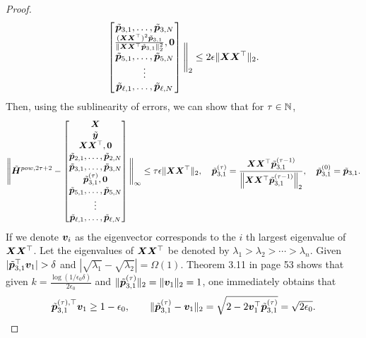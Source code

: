 \begin{proof}
\begin{align*}
\begin{bmatrix}
            \tilde{\boldsymbol{p}}_{3,1},\ldots,\tilde{\boldsymbol{p}}_{3,N}\\
            \frac{(\boldsymbol{X}\boldsymbol{X}^\top)^2\tilde{\boldsymbol{p}}_{3,1}}{\Vert\boldsymbol{X}\boldsymbol{X}^\top\tilde{\boldsymbol{p}}_{3,1}\Vert_2^2},\boldsymbol{0}\\
            \tilde{\boldsymbol{p}}_{5,1},\ldots,\tilde{\boldsymbol{p}}_{5,N}\\
            \vdots\\
            \tilde{\boldsymbol{p}}_{\ell,1},\ldots,\tilde{\boldsymbol{p}}_{\ell,N}
        \end{bmatrix}\Bigg\Vert_{2}\leq2\epsilon \Vert\boldsymbol{X}\boldsymbol{X}^\top\Vert_2.
    \end{align*}
    Then, using the sublinearity of errors, we can show that for $\tau\in\mathbb{N}$,
    \begin{align*}
              \Bigg\Vert \tilde{\boldsymbol{H}}^{pow,2\tau+2}- \begin{bmatrix}
            \boldsymbol{X}\\
            \tilde{\boldsymbol{y}}\\
            \boldsymbol{X}\boldsymbol{X}^\top,\boldsymbol{0}\\
            \tilde{\boldsymbol{p}}_{2,1},\ldots,\tilde{\boldsymbol{p}}_{2,N}\\
            \tilde{\boldsymbol{p}}_{3,1},\ldots,\tilde{\boldsymbol{p}}_{3,N}\\
            \tilde{\boldsymbol{p}}_{3,1}^{(\tau)},\boldsymbol{0}\\
            \tilde{\boldsymbol{p}}_{5,1},\ldots,\tilde{\boldsymbol{p}}_{5,N}\\
            \vdots\\
            \tilde{\boldsymbol{p}}_{\ell,1},\ldots,\tilde{\boldsymbol{p}}_{\ell,N}
        \end{bmatrix}\Bigg\Vert_{\infty}\leq \tau\epsilon\Vert\boldsymbol{X}\boldsymbol{X}^\top\Vert_2,\quad\tilde{\boldsymbol{p}}^{(\tau)}_{3,1}=\frac{\boldsymbol{X}\boldsymbol{X}^\top\tilde{\boldsymbol{p}}_{3,1}^{(\tau-1)}}{\left\Vert\boldsymbol{X}\boldsymbol{X}^\top\tilde{\boldsymbol{p}}_{3,1}^{(\tau-1)}\right\Vert_2},\quad\tilde{\boldsymbol{p}}_{3,1}^{(0)}=\tilde{\boldsymbol{p}}_{3,1}.
    \end{align*}
    If we denote $\boldsymbol{v}_i$ as the eigenvector corresponds to the $i$ th largest eigenvalue of $\boldsymbol{X}\boldsymbol{X}^\top$. Let the eigenvalues of $\boldsymbol{X}\boldsymbol{X}^\top$ be denoted by $\lambda_1>\lambda_2>\cdots>\lambda_n$. Given $|\tda p_{3,1}^\top\bfa v_1|>\delta$ and $|\sqrt{\lambda_1}-\sqrt{\lambda_2}|=\Omega(1)$. Theorem 3.11 in \citep{blum2020foundations} page 53 shows that given $k=\frac{\log(1/\epsilon_0\delta)}{2\epsilon_0}$ and $\Vert\tilde{\boldsymbol{p}}_{3,1}^{(\tau)}\Vert_2 = \Vert\boldsymbol{v}_1\Vert_2=1$, one immediately obtains that
    \begin{align*}  
    \tda p_{3,1}^{(\tau),\top}\bfa v_1\geq 1- \epsilon_0,\qquad\Vert\tda p_{3,1}^{(\tau)}-\bfa v_1\Vert_2 = \sqrt{2-2\bfa v_1^\top\tda p_{3,1}^{(\tau)}}=\sqrt{2\epsilon_0}.

\end{align*}
\end{proof}
